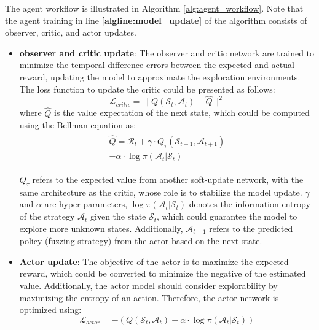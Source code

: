 \documentclass[lettersize,journal]{IEEEtran}
\begin{document}
The agent workflow is illustrated in Algorithm \ref{alg:agent_workflow}. Note that the agent training in line \textbf{\ref{algline:model_update}} of the algorithm consists of observer, critic, and actor updates.
\begin{itemize}
	\item \textbf{observer and critic update}: The observer and critic network are trained to minimize the temporal difference errors between the expected and actual reward, updating the model to approximate the exploration environments. The loss function to update the critic could be presented as follows:
	\begin{equation}
		\mathcal{L}_{critic} = \| Q(\mathcal{S}_{t}, \mathcal{A}_t) - \hat{Q} \|^2
	\end{equation}
	where $\hat{Q}$ is the value expectation of the next state, which could be computed using the Bellman equation as:
	\begin{align}
		\begin{split}
			\hat{Q} = \mathcal{R}_t + \gamma \cdot Q_{\tau}(\mathcal{S}_{t+1}, \mathcal{A}_{t+1}) \\
			- \alpha \cdot \log \pi(\mathcal{A}_{t} | \mathcal{S}_{t})
		\end{split}
	\end{align}
	
	$Q_\tau$ refers to the expected value from another soft-update network, with the same architecture as the critic, whose role is to stabilize the model update. $\gamma$ and $\alpha$ are hyper-parameters, $\log \pi(\mathcal{A}_{t} | \mathcal{S}_{t})$ denotes the information entropy of the strategy $\mathcal{A}_t$ given the state $\mathcal{S}_t$, which could guarantee the model to explore more unknown states. Additionally, $\mathcal{A}_{t+1}$ refers to the predicted policy (fuzzing strategy) from the actor based on the next state.
	
	\item \textbf{Actor update}: The objective of the actor is to maximize the expected reward, which could be converted to minimize the negative of the estimated value. Additionally, the actor model should consider explorability by maximizing the entropy of an action. Therefore, the actor network is optimized using:
	\begin{equation}
		\mathcal{L}_{actor} = - \left( Q(\mathcal{S}_{t}, \mathcal{A}_t) - \alpha \cdot \log \pi(\mathcal{A}_{t} | \mathcal{S}_{t}) \right)
	\end{equation}
\end{itemize}
\end{document}

